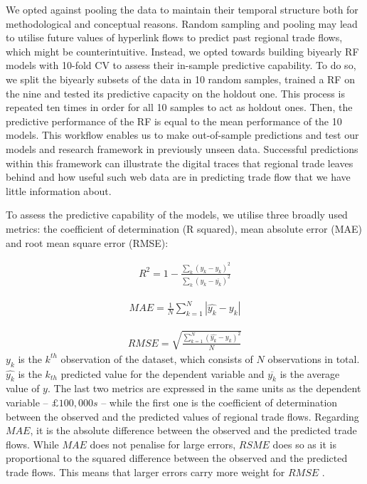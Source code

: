 \documentclass[]{interact}
\theoremstyle{plain}%
\theoremstyle{definition}
\theoremstyle{remark}
\begin{document}
We opted against pooling the data to maintain their temporal structure
both for methodological and conceptual reasons. Random sampling and
pooling may lead to utilise future values of hyperlink flows to predict
past regional trade flows, which might be counterintuitive. Instead, we
opted towards building biyearly RF models with 10-fold CV to assess
their in-sample predictive capability. To do so, we split the biyearly
subsets of the data in 10 random samples, trained a RF on the nine and
tested its predictive capacity on the holdout one. This process is
repeated ten times in order for all 10 samples to act as holdout ones.
Then, the predictive performance of the RF is equal to the mean
performance of the 10 models. This workflow enables us to make
out-of-sample predictions and test our models and research framework in
previously unseen data. Successful predictions within this framework can
illustrate the digital traces that regional trade leaves behind and how
useful such web data are in predicting trade flow that we have little
information about.

To assess the predictive capability of the models, we utilise three
broadly used metrics: the coefficient of determination (R squared), mean
absolute error (MAE) and root mean square error (RMSE):

\begin{align}
R^2 = 1 - \frac{\sum_{k} (y_{k} - \hat{y_{k}})^2} {\sum_{k} (y_{k} - \overline{y_{k}})^2} \label{eq:rsquared}
\end{align}

\begin{align}
MAE = \frac{1}{N} \sum_{k = 1}^{N} |\hat{y_{k}} - y_{k}| \label{eq:mae}
\end{align}

\begin{align}
RMSE =  \sqrt{\frac{\sum_{k = 1}^{N} (\hat{y_{k}} - y_{k})^2} {N}} \label{eq:rmse}
\end{align} \(y_{k}\) is the \(k^{th}\) observation of the dataset,
which consists of \(N\) observations in total. \(\hat{y_{k}}\) is the
\(k_{th}\) predicted value for the dependent variable and
\(\overline{y_{k}}\) is the average value of \(y\). The last two metrics
are expressed in the same units as the dependent variable --
\(\pounds 100,000s\) -- while the first one is the coefficient of
determination between the observed and the predicted values of regional
trade flows. Regarding \(MAE\), it is the absolute difference between
the observed and the predicted trade flows. While \(MAE\) does not
penalise for large errors, \(RSME\) does so as it is proportional to the
squared difference between the observed and the predicted trade flows.
This means that larger errors carry more weight for \(RMSE\)
\citep{pontius2008components}.
\end{document}
